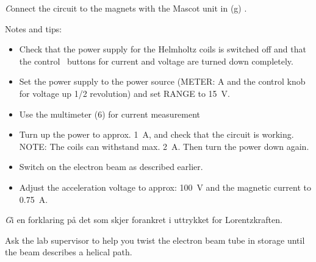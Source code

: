 \documentclass[../Elmag-labhefte-2020.tex]{subfiles}
\begin{document}
{\emph Connect the circuit to the magnets with the Mascot unit in (g)
.}


Notes and tips:
\vspace{-4mm}
\begin{itemize}
    \item Check that the power supply for the Helmholtz coils is switched off and that the control \ buttons for current and voltage are turned down completely.
    \item Set the power supply to the power source (METER: A and the control knob for voltage up 1/2 revolution) and set RANGE to \SI{15}{\volt}.
    \item Use the multimeter (6) for current measurement
    \item Turn up the power to approx. \SI{1}{\ampere}, and check that the circuit is working. NOTE: The coils can withstand max. \SI{2}{\ampere}. Then turn the power down again.
    \item Switch on the electron beam as described earlier.
    \item Adjust the acceleration voltage to approx: \SI{100}{\volt} and the magnetic current to \SI{0,75}{\ampere}.
\end{itemize}

{\emph Gi en forklaring på det som skjer forankret i uttrykket for Lorentzkraften. }

Ask the lab supervisor to help you twist the electron beam tube in storage until the beam describes a helical path.
\end{document}
